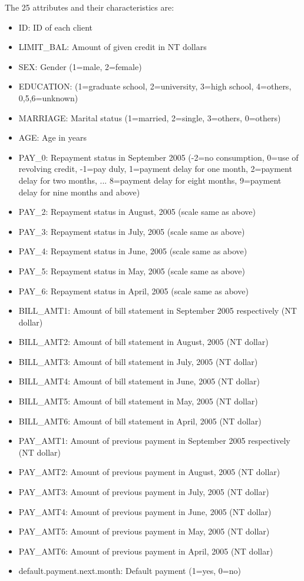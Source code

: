 \documentclass[fleqn,10pt]{SelfArx} %
\begin{document}
	The 25 attributes and their characteristics are:
	\begin{itemize}[noitemsep]
		\item ID: ID of each client
		\item LIMIT\_BAL: Amount of given credit in NT dollars
		\item SEX: Gender (1=male, 2=female)
		\item EDUCATION: (1=graduate school, 2=university, 3=high school, 4=others, 0,5,6=unknown)
		\item MARRIAGE: Marital status (1=married, 2=single, 3=others, 0=others)
		\item AGE: Age in years
		\item PAY\_0: Repayment status in September 2005 (-2=no consumption, 0=use of revolving credit, -1=pay duly, 1=payment delay for one month, 2=payment delay for two months, ... 8=payment delay for eight months, 9=payment delay for nine months and above)
		\item PAY\_2: Repayment status in August, 2005 (scale same as above)
		\item PAY\_3: Repayment status in July, 2005 (scale same as above)
		\item PAY\_4: Repayment status in June, 2005 (scale same as above)
		\item PAY\_5: Repayment status in May, 2005 (scale same as above)
		\item PAY\_6: Repayment status in April, 2005 (scale same as above)
		\item BILL\_AMT1: Amount of bill statement in September 2005 respectively (NT dollar)
		\item BILL\_AMT2: Amount of bill statement in August, 2005 (NT dollar)
		\item BILL\_AMT3: Amount of bill statement in July, 2005 (NT dollar)
		\item BILL\_AMT4: Amount of bill statement in June, 2005 (NT dollar)
		\item BILL\_AMT5: Amount of bill statement in May, 2005 (NT dollar)
		\item BILL\_AMT6: Amount of bill statement in April, 2005 (NT dollar)
		\item PAY\_AMT1: Amount of previous payment in September 2005 respectively (NT dollar)
		\item PAY\_AMT2: Amount of previous payment in August, 2005 (NT dollar)
		\item PAY\_AMT3: Amount of previous payment in July, 2005 (NT dollar)
		\item PAY\_AMT4: Amount of previous payment in June, 2005 (NT dollar)
		\item PAY\_AMT5: Amount of previous payment in May, 2005 (NT dollar)
		\item PAY\_AMT6: Amount of previous payment in April, 2005 (NT dollar)
		\item default.payment.next.month: Default payment (1=yes, 0=no)
	\end{itemize}
	
\end{document}
